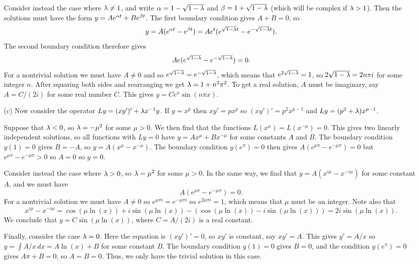\documentclass[a4paper]{amsart}
\begin{document}
\begin{solution}
\begin{itemize}
   Consider instead the case where $\lambda\neq 1$, and write
   $\alpha=1-\sqrt{1-\lambda}$ and $\beta=1+\sqrt{1-\lambda}$ (which will be
   complex if $\lambda>1$).  Then the solutions must have the form
   $y=Ae^{\alpha t}+Be^{\beta t}$.  The first boundary condition gives
   $A+B=0$, so 
   \[ y=A(e^{\alpha t}-e^{\beta t})=
          Ae^t(e^{\sqrt{1-\lambda}t}-e^{-\sqrt{1-\lambda}t}).
   \]
   The second boundary condition therefore gives
   \[ Ae(e^{\sqrt{1-\lambda}}-e^{-\sqrt{1-\lambda}}) = 0. \]
   For a nontrivial solution we must have $A\neq 0$ and so 
   $e^{\sqrt{1-\lambda}}=e^{-\sqrt{1-\lambda}}$, which means that
   $e^{2\sqrt{1-\lambda}}=1$, so $2\sqrt{1-\lambda}=2n\pi i$ for some integer
   $n$.  After squaring both sides and rearranging we get
   $\lambda=1+n^2\pi^2$.  To get a real solution, $A$ must be imaginary,
   say $A=C/(2i)$ for some real number $C$.  This gives
   $y=Ce^x\sin(n\pi x)$.
  \item[(c)] Now consider the operator $Ly=(xy')'+\lambda x^{-1}y$.  If
   $y=x^p$ then $xy'=px^p$ so $(xy')'=p^2x^{p-1}$ and
   $Ly=(p^2+\lambda)x^{p-1}$.  

   Suppose that $\lambda<0$, so $\lambda=-\mu^2$ for some $\mu>0$.  We then
   find that the functions $L(x^\mu)=L(x^{-\mu})=0$.  This gives two
   linearly independent solutions, so all functions with $Ly=0$ have
   $y=Ax^\mu+Bx^{-\mu}$ for some constants $A$ and $B$.  The boundary
   condition $y(1)=0$ gives $B=-A$, so $y=A(x^\mu-x^{-\mu})$.  The
   boundary condition $y(e^\pi)=0$ then gives
   $A(e^{\mu\pi}-e^{-\mu\pi})=0$ but $e^{\mu\pi}-e^{-\mu\pi}>0$ so
   $A=0$ so $y=0$.

   Consider instead the case where $\lambda>0$, so $\lambda=\mu^2$ for some
   $\mu>0$.  In the same way, we find that
   $y=A(x^{i\mu}-x^{-i\mu})$ for some constant $A$, and we must
   have 
   \[ A(e^{\mu\pi}-e^{-\mu\pi})=0. \]
   For a nontrivial solution we must have $A\neq 0$ so
   $e^{\mu\pi i}=e^{-\mu\pi i}$ so $e^{2\mu\pi i}=1$, which means that
   $\mu$ must be an integer.  Note also that 
   \[ x^{i\mu}-x^{-i\mu} = 
       \cos(\mu\ln(x)) + i\sin(\mu\ln(x)) - 
       (\cos(\mu\ln(x)) - i\sin(\mu\ln(x))) = 2i\sin(\mu\ln(x)).
   \]
   We conclude that $y=C\sin(\mu\ln(x))$, where $C=A/(2i)$ is
   a real constant. 

   Finally, consider the case $\lambda=0$.  Here the equation is
   $(xy')'=0$, so $xy'$ is constant, say $xy'=A$.  This gives $y'=A/x$
   so $y=\int A/x\,dx=A\ln(x)+B$ for some constant $B$.  The boundary
   condition $y(1)=0$ gives $B=0$, and the condition $y(e^\pi)=0$
   gives $A\pi+B=0$, so $A=B=0$.  Thus, we only have the trivial
   solution in this case.
 \end{itemize}
\end{solution}
\end{document}
